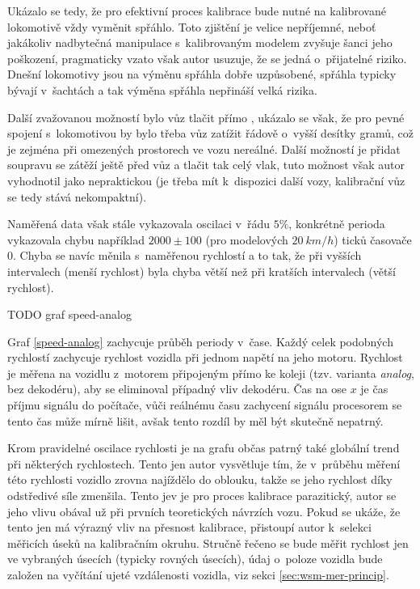 Ukázalo se tedy, že pro efektivní proces kalibrace bude nutné na kalibrované
lokomotivě vždy vyměnit spřáhlo. Toto zjištění je velice nepříjemné, neboť
jakákoliv nadbytečná manipulace s~kalibrovaným modelem zvyšuje šanci jeho
poškození, pragmaticky vzato však autor usuzuje, že se jedná o~přijatelné
riziko. Dnešní lokomotivy jsou na výměnu spřáhla dobře uzpůsobené, spřáhla
typicky bývají v~šachtách a tak výměna spřáhla nepřináší velká rizika.

Další zvažovanou možností bylo vůz tlačit přímo ,
ukázalo se však, že pro pevné spojení s~lokomotivou by bylo třeba vůz zatížit
řádově o~vyšší desítky gramů, což je zejména při omezených prostorech ve vozu
nereálné. Další možností je přidat soupravu se zátěží ještě před vůz a tlačit
tak celý vlak, tuto možnost však autor vyhodnotil jako nepraktickou (je třeba
mít k~dispozici další vozy, kalibrační vůz se tedy stává nekompaktní).

Naměřená data však stále vykazovala oscilaci v~řádu $5 \%$, konkrétně perioda
vykazovala chybu například $2000 \pm 100$ (pro modelových $20\ km/h$) ticků
časovače 0. Chyba se navíc měnila s~naměřenou rychlostí a to tak, že při
vyšších intervalech (menší rychlost) byla chyba větší než při kratších
intervalech (větší rychlost).

TODO graf speed-analog

Graf \ref{speed-analog} zachycuje průběh periody v~čase. Každý celek podobných
rychlostí zachycuje rychlost vozidla při jednom napětí na jeho motoru. Rychlost
je měřena na vozidlu z~motorem připojeným přímo ke koleji (tzv. varianta
\textit{analog}, bez dekodéru), aby se eliminoval případný vliv dekodéru.
Čas na ose $x$ je čas příjmu signálu do počítače, vůči reálnému času zachycení
signálu procesorem se tento čas může mírně lišit, avšak tento rozdíl by měl
být skutečně nepatrný.

Krom pravidelné oscilace rychlosti je na grafu občas patrný také globální
 trend při některých rychlostech. Tento jen autor vysvětluje tím,
že v~průběhu měření této rychlosti vozidlo zrovna najíždělo do oblouku, takže
se jeho rychlost díky odstředivé síle zmenšila. Tento jev je pro proces
kalibrace parazitický, autor se jeho vlivu obával už při prvních teoretických
návrzích vozu. Pokud se ukáže, že tento jen má výrazný vliv na přesnost
kalibrace, přistoupí autor k~selekci měřicích úseků na kalibračním okruhu.
Stručně řečeno se bude měřit rychlost jen ve vybraných úsecích (typicky rovných
úsecích), údaj o~poloze vozidla bude založen na vyčítání ujeté vzdálenosti
vozidla, viz sekci \ref{sec:wsm-mer-princip}.


